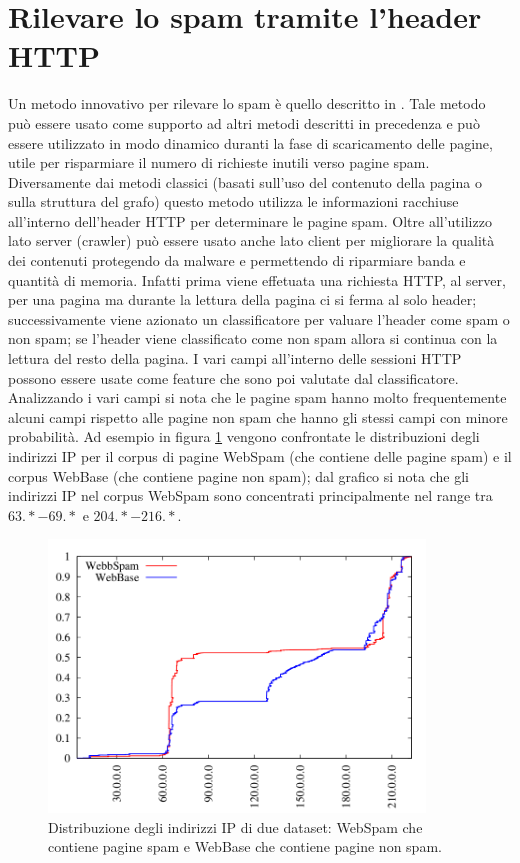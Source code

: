 \section{Rilevare lo spam tramite l'header HTTP}
Un metodo innovativo per rilevare lo spam è quello descritto in \cite{Webb:2008:PWS:1458082.1458129}. Tale metodo può essere usato come supporto ad altri metodi descritti in precedenza e può essere utilizzato in modo dinamico duranti la fase di scaricamento delle pagine, utile per risparmiare il numero di richieste inutili verso pagine spam. Diversamente dai metodi classici (basati sull'uso del contenuto della pagina o sulla struttura del grafo) questo metodo utilizza le informazioni racchiuse all'interno dell'header HTTP per determinare le pagine spam. Oltre all'utilizzo lato server (crawler) può essere usato anche lato client per migliorare la qualità dei contenuti protegendo da malware e permettendo di riparmiare banda e quantità di memoria. Infatti prima viene effetuata una richiesta HTTP, al server, per una pagina ma durante la lettura della pagina ci si ferma al solo header; successivamente viene azionato un classificatore per valuare l'header come spam o non spam; se l'header viene classificato come 
non spam allora si continua con la lettura del resto della pagina. I vari campi all'interno delle sessioni HTTP possono essere usate come feature che sono poi valutate dal classificatore. Analizzando i vari campi si nota che le pagine spam hanno molto frequentemente alcuni campi rispetto alle pagine non spam che hanno gli stessi campi con minore probabilità. Ad esempio in figura \ref{img:webb1} vengono confrontate le distribuzioni degli indirizzi IP per il corpus di pagine WebSpam (che contiene delle pagine spam) e il corpus WebBase (che contiene pagine non spam); dal grafico si nota che gli indirizzi IP nel corpus WebSpam sono concentrati principalmente nel range tra \(63.* - 69.*\) e \(204.* - 216.*\).
\begin{figure}
\centering
\includegraphics[width=10cm]{immagini/altre/webb.png}
\caption{Distribuzione degli indirizzi IP di due dataset: WebSpam che contiene pagine spam e WebBase che contiene pagine non spam.}
\label{img:webb1}
\end{figure}
